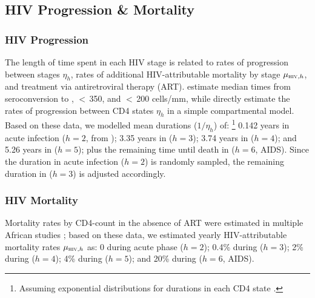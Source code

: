 \subsection{HIV Progression \& Mortality}\label{mod.par.hiv}
\subsubsection{HIV Progression}\label{mod.par.hiv.dur}
The length of time spent in each HIV stage is related to
rates of progression between stages $\eta_{h}$,
rates of additional HIV-attributable mortality by stage $\mu_{\textsc{hiv},h}$,
and treatment via antiretroviral therapy (ART).
\citet{Lodi2011} estimate median times from seroconversion to
, $<$\,350, and $<$\,200 cells/mm, while
\citet{Mangal2017} directly estimate the rates of progression between CD4 states $\eta_{h}$
in a simple compartmental model.
Based on these data, we modelled mean durations ($1/\eta_{h}$) of:%
\footnote{Assuming exponential distributions for durations in each CD4 state \cite{Roberts2015}.}
0.142 years in acute infection ($h=2$, from );
3.35 years in  ($h=3$);
3.74 years in  ($h=4$); and
5.26 years in  ($h=5$); plus
the remaining time until death in  ($h=6$, AIDS).
Since the duration in acute infection ($h=2$) is randomly sampled,
the remaining duration in  ($h=3$) is adjusted accordingly.
\subsubsection{HIV Mortality}\label{mod.par.hiv.mort}
Mortality rates by CD4-count in the absence of ART were estimated in
multiple African studies \cite{Badri2006,Anglaret2012,Mangal2017};
based on these data, we estimated yearly HIV-attributable mortality rates $\mu_{\textsc{hiv},h}$ as:
0 during acute phase ($h=2$);
0.4\% during  ($h=3$);
2\% during  ($h=4$);
4\% during  ($h=5$); and
20\% during  ($h=6$, AIDS).
